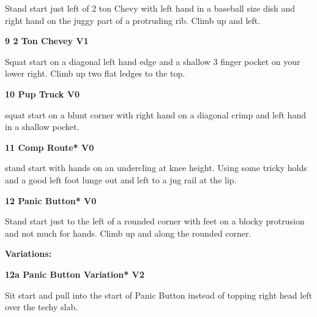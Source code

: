 \begin{multicols}{2}
					\begin{adjustwidth}{0.5cm}{}				
					Stand start just left of 2 ton Chevy with left hand in a baseball size dish and right hand on the juggy part of a protruding rib. Climb up and left.
					\end{adjustwidth}
					\label{rt:2 Ton Chevey}
\colorbox{green!20}{
\parbox{0.95\linewidth}{
\textbf{
9 2 Ton Chevey V1  
}
}
}

					\begin{adjustwidth}{0.5cm}{}				
					Squat start on a diagonal left hand edge and a shallow 3 finger pocket on your lower right. Climb up two flat ledges to the top.
					\end{adjustwidth}
					\label{rt:Pup Truck}
\colorbox{green!20}{
\parbox{0.95\linewidth}{
\textbf{
10 Pup Truck V0  
}
}
}

					\begin{adjustwidth}{0.5cm}{}				
					squat start on a blunt corner with right hand on a diagonal crimp and left hand in a shallow pocket.
					\end{adjustwidth}

					\label{rt:Comp Route}
\colorbox{green!20}{
\parbox{0.95\linewidth}{
\textbf{
11 Comp Route* V0  
}
}
}

					\begin{adjustwidth}{0.5cm}{}				
					stand start with hands on an undercling at knee height. Using some tricky holds and a good left foot lunge out and left to a jug rail at the lip.
					\end{adjustwidth}
					\label{rt:Panic Button}
\colorbox{green!20}{
\parbox{0.95\linewidth}{
\textbf{
12 Panic Button* V0  
}
}
}

					\begin{adjustwidth}{0.5cm}{}				
					Stand start just to the left of a rounded corner with feet on a blocky protrusion and not much for hands. Climb up and along the rounded corner.
					\end{adjustwidth}
						\begin{adjustwidth}{0.5cm}{}				
						\textbf{Variations:} \newline
							\label{vr:Panic Button Variation}
\colorbox{green!20}{
\parbox{0.95\linewidth}{
\textbf{
12a Panic Button Variation* V2  
}
}
}

							\begin{adjustwidth}{0.5cm}{}				
							Sit start and pull into the start of Panic Button instead of topping right head left over the techy slab.
							\end{adjustwidth}
						\end{adjustwidth}

\end{multicols}
